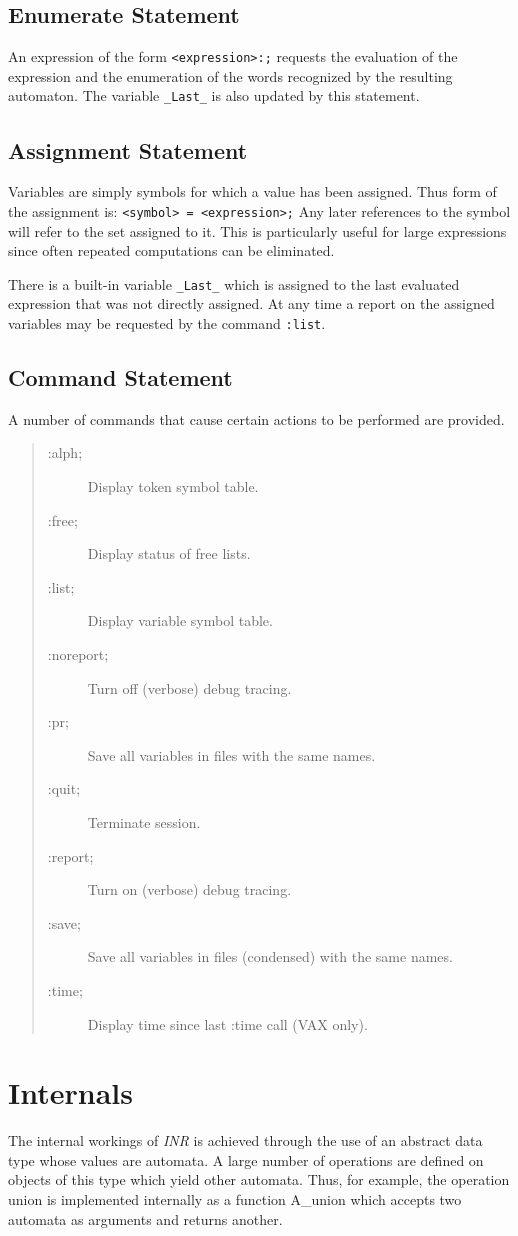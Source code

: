 \subsection{Enumerate Statement}
An expression of the form
\verb#<expression>:;#
requests the evaluation of the expression and the enumeration of the words
recognized by the resulting automaton.
The variable \verb#_Last_# is also updated by this statement.

\subsection{Assignment Statement}
Variables are simply symbols for which a value has been assigned.
Thus form of the assignment is:
\verb#<symbol> = <expression>;#
Any later references to the symbol will refer to the set assigned to it.
This is particularly useful for large expressions since often repeated
computations can be eliminated.

There is a built-in variable \verb#_Last_# which is assigned to the
last evaluated expression that was not directly assigned.
At any time a report on the assigned variables may be requested by the
command \verb#:list#.

\subsection{Command Statement}
A number of commands that cause certain actions to be performed are
provided.
\begin{quote}
\begin{description}
\item[:alph;] Display token symbol table.
\item[:free;] Display status of free lists.
\item[:list;] Display variable symbol table.
\item[:noreport;] Turn off (verbose) debug tracing.
\item[:pr;] Save all variables in files with the same names.
\item[:quit;] Terminate session.
\item[:report;] Turn on (verbose) debug tracing.
\item[:save;] Save all variables in files (condensed) with the same names.
\item[:time;] Display time since last :time call (VAX only).
\end{description}
\end{quote}
\section{Internals}
The internal workings of {\em INR} is achieved through the use of an
abstract data type whose values are automata.
A large number of operations are defined on objects of this type which
yield other automata.
Thus, for example, the operation union is implemented internally as a
function A\_union which accepts two automata as arguments and returns another.

